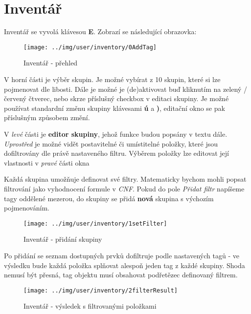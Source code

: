 
\section{Inventář}

Inventář se vyvolá klávesou \textbf{E}. Zobrazí se následující obrazovka:

\begin{figure}[!h]\centering
\texttt{[image: ../img/user/inventory/0AddTag]}

\caption{Inventář - přehled}
\label{fig:user_inventory_0AddTag}

\end{figure}

\FloatBarrier

V horní části je výběr skupin. Je možné vybírat z 10 skupin, které si lze pojmenovat dle libosti. Dále je možné je (de)aktivovat buď kliknutím na zelený / červený čtverec, nebo skrze příslušný checkbox v editaci skupiny.
Je možné používat standardní změnu skupiny klávesami \textbf{ú} a \textbf{)}, editační okno se pak příslušným způsobem změní. 

V \textit{levé} části je \textbf{editor skupiny}, jehož funkce budou popsány v textu dále. \textit{Uprostřed} je možné vidět postavitelné či umístitelné položky, které jsou dofiltrovány dle právě nastaveného filtru. Výběrem položky lze editovat její vlastnosti v \textit{pravé} části okna

\FloatBarrier

Každá skupina umožňuje definovat své filtry. Matematicky bychom mohli popsat filtrování jako vyhodnocení formule v \textit{CNF}. Pokud do pole \textit{Přidat filtr} napíšeme tagy oddělené mezerou, do skupiny se přidá \textbf{nová} skupina s výchozím pojmenováním.

\begin{figure}[!h]\centering
\texttt{[image: ../img/user/inventory/1setFilter]}

\caption{Inventář - přidání skupiny}
\label{fig:user_inventory_1setFilter}

\end{figure}

\FloatBarrier

Po přidání se seznam dostupných prvků dofiltruje podle nastavených tagů - ve výsledku bude každá položka splňovat alespoň jeden tag z každé skupiny. Shoda nemusí být přesná, tag objektu musí obsahovat podřetězec definovaný filtrem.
\begin{figure}[!h]\centering
\texttt{[image: ../img/user/inventory/2filterResult]}

\caption{Inventář - výsledek s filtrovanými položkami}
\label{fig:user_inventory_2filterResult}

\end{figure}

